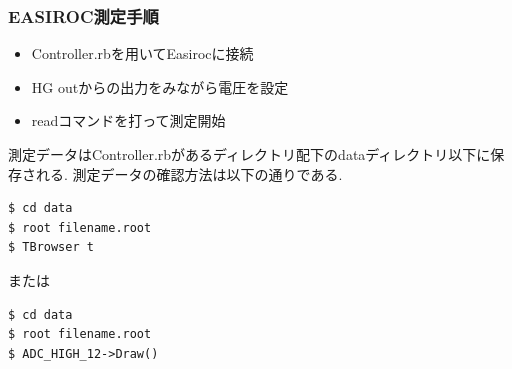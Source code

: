 \subsubsection{EASIROC測定手順}
\begin{itemize}
  \item Controller.rbを用いてEasirocに接続
  \item HG outからの出力をみながら電圧を設定
  \item readコマンドを打って測定開始
\end{itemize}
測定データはController.rbがあるディレクトリ配下のdataディレクトリ以下に保存される.
測定データの確認方法は以下の通りである.
\begin{lstlisting}
$ cd data
$ root filename.root
$ TBrowser t
\end{lstlisting}
または
\begin{lstlisting}
$ cd data
$ root filename.root
$ ADC_HIGH_12->Draw()
\end{lstlisting}
